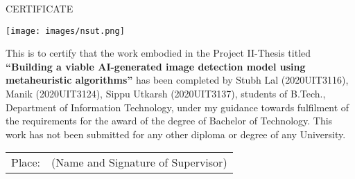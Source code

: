 \thispagestyle{plain}
\begin{center}
\large \large {CERTIFICATE}

\end{center}
\begin{center}
   \texttt{[image: images/nsut.png]} 
\end{center}

\begin{center}
  \fontsize{12pt}{24pt}\selectfont{Department of Information technology\\Delhi-110078, India } 
 
\end{center}
\vspace{0.3cm}
\fontsize{12pt}{24pt}\selectfont This is to certify that the work embodied in the Project II-Thesis titled \textbf{“Building a viable AI-generated image detection model using metaheuristic algorithms”} has  been completed by Stubh Lal (2020UIT3116), Manik (2020UIT3124), Sippu Utkarsh (2020UIT3137), students of B.Tech., Department of  Information Technology, under my guidance towards fulfilment of the requirements for the  award of the degree of Bachelor of Technology. This work has not been submitted for any other  diploma or degree of any University. 


\vspace{2.0cm}


\begin{tabu} to \textwidth { X[l] X[c] }

Place: & (Name and Signature of Supervisor) 
 
\end{tabu}

\fontsize{12pt}{24pt}\selectfont{Date: } 


\newpage